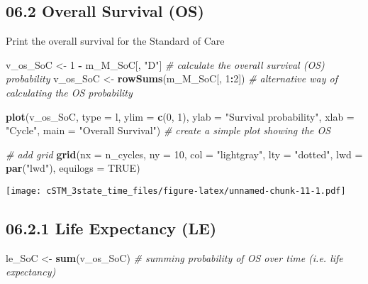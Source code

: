\documentclass[
]{article}
\newenvironment{Shaded}{\begin{snugshade}}{\end{snugshade}}
\newcommand{\AttributeTok}[1]{\textcolor[rgb]{0.13,0.29,0.53}{#1}}
\newcommand{\CommentTok}[1]{\textcolor[rgb]{0.56,0.35,0.01}{\textit{#1}}}
\newcommand{\ConstantTok}[1]{\textcolor[rgb]{0.56,0.35,0.01}{#1}}
\newcommand{\DecValTok}[1]{\textcolor[rgb]{0.00,0.00,0.81}{#1}}
\newcommand{\FunctionTok}[1]{\textcolor[rgb]{0.13,0.29,0.53}{\textbf{#1}}}
\newcommand{\NormalTok}[1]{#1}
\newcommand{\OtherTok}[1]{\textcolor[rgb]{0.56,0.35,0.01}{#1}}
\newcommand{\SpecialCharTok}[1]{\textcolor[rgb]{0.81,0.36,0.00}{\textbf{#1}}}
\newcommand{\StringTok}[1]{\textcolor[rgb]{0.31,0.60,0.02}{#1}}
\begin{document}
\hypertarget{overall-survival-os}{%
\subsection{06.2 Overall Survival (OS)}\label{overall-survival-os}}

Print the overall survival for the Standard of Care

\begin{Shaded}
\begin{Highlighting}[]
\NormalTok{v\_os\_SoC }\OtherTok{\textless{}{-}} \DecValTok{1} \SpecialCharTok{{-}}\NormalTok{ m\_M\_SoC[, }\StringTok{"D"}\NormalTok{]    }\CommentTok{\# calculate the overall survival (OS) probability}
\NormalTok{v\_os\_SoC }\OtherTok{\textless{}{-}} \FunctionTok{rowSums}\NormalTok{(m\_M\_SoC[, }\DecValTok{1}\SpecialCharTok{:}\DecValTok{2}\NormalTok{])  }\CommentTok{\# alternative way of calculating the OS probability   }

\FunctionTok{plot}\NormalTok{(v\_os\_SoC, }\AttributeTok{type =} \StringTok{\textquotesingle{}l\textquotesingle{}}\NormalTok{, }
     \AttributeTok{ylim =} \FunctionTok{c}\NormalTok{(}\DecValTok{0}\NormalTok{, }\DecValTok{1}\NormalTok{),}
     \AttributeTok{ylab =} \StringTok{"Survival probability"}\NormalTok{,}
     \AttributeTok{xlab =} \StringTok{"Cycle"}\NormalTok{,}
     \AttributeTok{main =} \StringTok{"Overall Survival"}\NormalTok{)  }\CommentTok{\# create a simple plot showing the OS}

\CommentTok{\# add grid }
\FunctionTok{grid}\NormalTok{(}\AttributeTok{nx =}\NormalTok{ n\_cycles, }\AttributeTok{ny =} \DecValTok{10}\NormalTok{, }\AttributeTok{col =} \StringTok{"lightgray"}\NormalTok{, }\AttributeTok{lty =} \StringTok{"dotted"}\NormalTok{, }\AttributeTok{lwd =} \FunctionTok{par}\NormalTok{(}\StringTok{"lwd"}\NormalTok{), }
     \AttributeTok{equilogs =} \ConstantTok{TRUE}\NormalTok{) }
\end{Highlighting}
\end{Shaded}

\texttt{[image: cSTM\_3state\_time\_files/figure-latex/unnamed-chunk-11-1.pdf]}

\hypertarget{life-expectancy-le}{%
\subsection{06.2.1 Life Expectancy (LE)}\label{life-expectancy-le}}

\begin{Shaded}
\begin{Highlighting}[]
\NormalTok{le\_SoC }\OtherTok{\textless{}{-}} \FunctionTok{sum}\NormalTok{(v\_os\_SoC)  }\CommentTok{\# summing probability of OS over time  (i.e. life expectancy)}
\end{Highlighting}
\end{Shaded}
\end{document}
